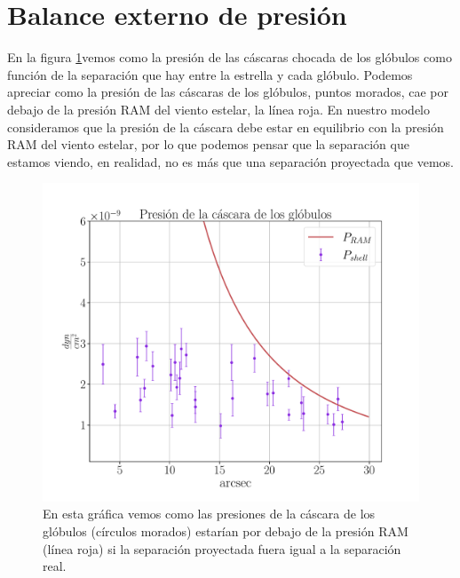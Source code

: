 \documentclass{book}
\begin{document}
\section{Balance externo de presión}\label{Sec:proyeccion}

En la figura \ref{graf_presion}vemos como la presión de las cáscaras chocada de los glóbulos como función de la separación que hay entre la estrella y cada glóbulo. Podemos apreciar como la presión de las cáscaras de los glóbulos, puntos morados, cae por debajo de la presión RAM del viento estelar, la línea roja. En nuestro modelo consideramos que la presión de la cáscara debe estar en equilibrio con la presión RAM del viento estelar, por lo que podemos pensar que la separación que estamos viendo, en realidad, no es más que una separación proyectada que vemos. 

\begin{figure}[htb]
    \centering
    \includegraphics[width=\textwidth]{Nuevas imagenes finales/R_inf.pdf}
    \caption{En esta gráfica vemos como las presiones de la cáscara de los glóbulos (círculos morados) estarían por debajo de la presión RAM (línea roja) si la separación proyectada fuera igual a la separación real.}
    \label{graf_presion}
\end{figure}
\end{document}
